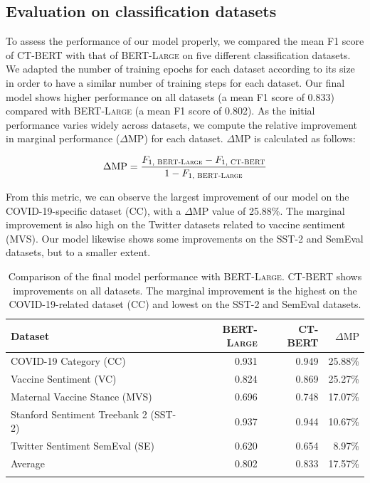 \documentclass{article}
\begin{document}
\begin{multicols}{2}

\subsection{Evaluation on classification datasets}
\label{sec:evaluation_classification}

To assess the performance of our model properly, we compared the mean F1 score of \textsc{CT-BERT} with that of \textsc{BERT-Large} on five different classification datasets.
We adapted the number of training epochs for each dataset according to its size in order to have a similar number of training steps for each dataset.
  Our final model shows higher performance on all datasets (a mean F1 score of \num{0.833}) compared with \textsc{BERT-Large} (a mean F1 score of \num{0.802}).
As the initial performance varies widely across datasets, we compute the relative improvement in marginal performance ($\Delta$MP) for each dataset.
$\Delta$MP is calculated as follows:

$$ \Delta\text{MP} = \frac{F_{1, \text{ \textsc{BERT-Large}}} - F_{1, \text{ \textsc{CT-BERT}}}}{1- F_{1, \text{ \textsc{BERT-Large}}}} $$

From this metric, we can observe the largest improvement of our model on the COVID-19-specific dataset (CC), with a $\Delta$MP value of 25.88\%.
The marginal improvement is also high on the Twitter datasets related to vaccine sentiment (MVS).
Our model likewise shows some improvements on the SST-2 and SemEval datasets, but to a smaller extent.

\end{multicols}
\begin{table}
  \centering
  \begin{tabular}{lrrr}
    \toprule
    Dataset  & \textsc{BERT-Large} & \textsc{CT-BERT} & $\Delta\text{MP}$  \\
    \midrule
    COVID-19 Category (CC)                    & 0.931 & 0.949 & 25.88\%  \\
    Vaccine Sentiment (VC)                    & 0.824 & 0.869 & 25.27\%  \\
    Maternal Vaccine Stance (MVS)             & 0.696 & 0.748 & 17.07\%  \\
    Stanford Sentiment Treebank 2 (SST-2)     & 0.937 & 0.944 & 10.67\%  \\
    Twitter Sentiment SemEval (SE)            & 0.620 & 0.654 & 8.97\%   \\
    \midrule
    Average &  0.802 & 0.833 & 17.57\% \\
    \bottomrule \\
  \end{tabular}
  \caption{
    Comparison of the final model performance with \textsc{BERT-Large}.
    \textsc{CT-BERT} shows improvements on all datasets.
    The marginal improvement is the highest on the COVID-19-related dataset (CC) and lowest on the SST-2 and SemEval datasets.
  }
  \label{tab:tab2}
\end{table}
\end{document}
